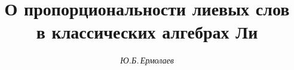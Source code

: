 








\newcommand{\Char}{\operatorname{char}}


\newcommand{\diag}{\operatorname{diag}}


\newcommand{\tts}[1]{}







\setcounter{page}{25}















\author{\it Ю.Б.\,Ермолаев}




\title{О пропорциональности лиевых слов \\


в классических алгебрах Ли}





\date{}




\pagestyle{plain} %







\maketitle


